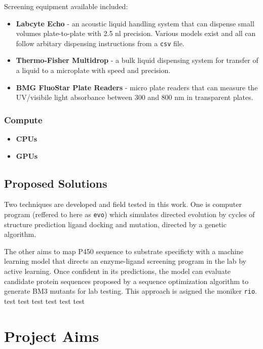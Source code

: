 Screening equipment available included:

\begin{itemize}
\tightlist
\item
  \textbf{Labcyte Echo} - an acoustic liquid handling system that can
  dispense small volumes plate-to-plate with 2.5 nl precision. Various
  models exist and all can follow arbitary dispensing instructions from
  a \texttt{csv} file.
\item
  \textbf{Thermo-Fisher Multidrop} - a bulk liquid dispensing system for
  transfer of a liquid to a microplate with speed and precision.
\item
  \textbf{BMG FluoStar Plate Readers} - micro plate readers that can
  measure the UV/visibile light absorbance between 300 and 800 nm in
  transparent plates.
\end{itemize}

\hypertarget{compute}{%
\subsubsection{Compute}\label{compute}}

\begin{itemize}
\tightlist
\item
  \textbf{CPUs}
\item
  \textbf{GPUs}
\end{itemize}

\hypertarget{proposed-solutions}{%
\subsection{Proposed Solutions}\label{proposed-solutions}}

Two techniques are developed and field tested in this work. One is
computer program (reffered to here as \texttt{evo}) which simulates
directed evolution by cycles of structure prediction ligand docking and
mutation, directed by a genetic algorithm.

The other aims to map P450 sequence to substrate specificty with a
machine learning model that directs an enzyme-ligand screening program
in the lab by active learning. Once confident in its predictions, the
model can evaluate candidate protein sequences proposed by a sequence
optimization algorithm to generate BM3 mutants for lab testing. This
approach is asigned the moniker \texttt{rio}. test test test test test
test

\hypertarget{project-aims}{%
\section{Project Aims}\label{project-aims}}

